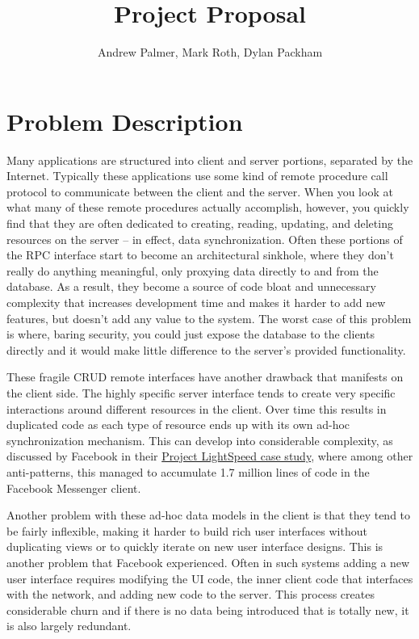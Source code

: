 \documentclass[12pt]{article}
\title{Project Proposal}
\author{Andrew Palmer, Mark Roth, Dylan Packham}
\begin{document}
    \maketitle

    \section{Problem Description}
    Many applications are structured into client and server portions, separated by the Internet.
    Typically these applications use some kind of remote procedure call protocol to communicate between the client and the server.
    When you look at what many of these remote procedures actually accomplish, however, you quickly find that they are often dedicated to creating, reading, updating, and deleting resources on the server -- in effect, data synchronization.
    Often these portions of the RPC interface start to become an architectural sinkhole, where they don't really do anything meaningful, only proxying data directly to and from the database.
    As a result, they become a source of code bloat and unnecessary complexity that increases development time and makes it harder to add new features, but doesn't add any value to the system.
    The worst case of this problem is where, baring security, you could just expose the database to the clients directly and it would make little difference to the server's provided functionality.

    These fragile CRUD remote interfaces have another drawback that manifests on the client side.
    The highly specific server interface tends to create very specific interactions around different resources in the client.
    Over time this results in duplicated code as each type of resource ends up with its own ad-hoc synchronization mechanism.
    This can develop into considerable complexity, as discussed by Facebook in their \href{https://engineering.fb.com/2020/03/02/data-infrastructure/messenger/}{Project LightSpeed case study}, where among other anti-patterns, this managed to accumulate 1.7 million lines of code in the Facebook Messenger client.

    Another problem with these ad-hoc data models in the client is that they tend to be fairly inflexible, making it harder to build rich user interfaces without duplicating views or to quickly iterate on new user interface designs.
    This is another problem that Facebook experienced.
    Often in such systems adding a new user interface requires modifying the UI code, the inner client code that interfaces with the network, and adding new code to the server.
    This process creates considerable churn and if there is no data being introduced that is totally new, it is also largely redundant.
\end{document}
